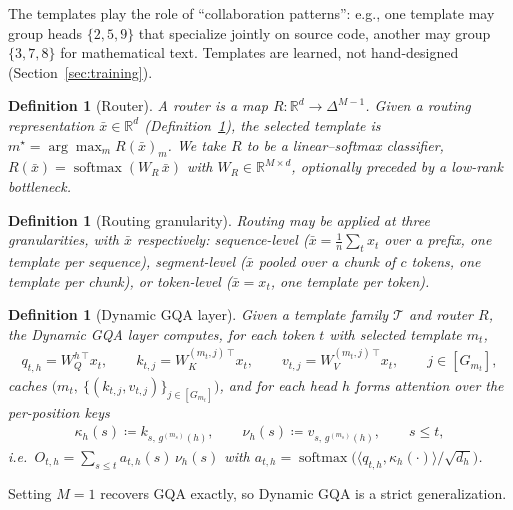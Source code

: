 \documentclass{article}
\newtheorem{definition}[theorem]{Definition}
\newcommand{\R}{\mathbb{R}}
\newcommand{\softmax}{\operatorname{softmax}}
\begin{document}
The templates play the role of ``collaboration patterns'': e.g., one
template may group heads $\{2,5,9\}$ that specialize jointly on source code,
another may group $\{3,7,8\}$ for mathematical text. Templates are learned,
not hand-designed (Section~\ref{sec:training}).

\begin{definition}[Router]
\label{def:router}
A \emph{router} is a map $R : \R^{d} \to \Delta^{M-1}$. Given a routing
representation $\bar{x} \in \R^d$ (Definition~\ref{def:granularity}), the
selected template is $m^\star = \arg\max_{m} R(\bar{x})_m$. We take $R$ to
be a linear--softmax classifier, $R(\bar{x}) = \softmax(W_R\, \bar{x})$ with
$W_R \in \R^{M \times d}$, optionally preceded by a low-rank bottleneck.
\end{definition}

\begin{definition}[Routing granularity]
\label{def:granularity}
Routing may be applied at three granularities, with $\bar{x}$ respectively:
\emph{sequence-level} ($\bar{x} = \frac1n \sum_t x_t$ over a prefix, one
template per sequence), \emph{segment-level} ($\bar x$ pooled over a chunk
of $c$ tokens, one template per chunk), or \emph{token-level}
($\bar x = x_t$, one template per token).
\end{definition}

\begin{definition}[Dynamic GQA layer]
\label{def:dgqa}
Given a template family $\mathcal{T}$ and router $R$, the Dynamic GQA layer
computes, for each token $t$ with selected template $m_t$,
\begin{align}
q_{t,h} = W_Q^{h\,\top} x_t, \qquad
k_{t,j} = W_K^{(m_t, j)\,\top} x_t, \qquad
v_{t,j} = W_V^{(m_t, j)\,\top} x_t, \qquad j \in [G_{m_t}],
\end{align}
caches $\big(m_t,\ \{(k_{t,j}, v_{t,j})\}_{j \in [G_{m_t}]}\big)$, and for
each head $h$ forms attention over the per-position keys
\begin{align}
\kappa_h(s) \coloneqq k_{s,\, g^{(m_s)}(h)}, \qquad
\nu_h(s) \coloneqq v_{s,\, g^{(m_s)}(h)}, \qquad s \le t,
\label{eq:kappa}
\end{align}
i.e.\ $O_{t,h} = \sum_{s \le t} a_{t,h}(s)\, \nu_h(s)$ with
$a_{t,h} = \softmax\big( \langle q_{t,h}, \kappa_h(\cdot) \rangle / \sqrt{d_h} \big)$.
\end{definition}

Setting $M = 1$ recovers GQA exactly, so Dynamic GQA is a strict
generalization.
\end{document}
